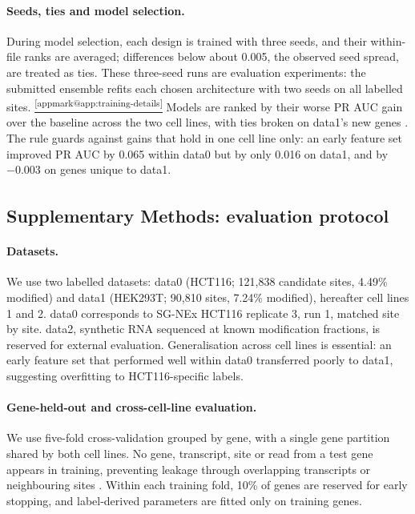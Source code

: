 \documentclass[11pt,a4paper]{article}
\makeatletter
\newcounter{appmarknum}
\DeclareRobustCommand{\appmark}[1]{%
    \refstepcounter{appmarknum}\label{appmark@#1}%
    \textsuperscript{\arabic{appmarknum}}}
\DeclareRobustCommand{\applink}[1]{%
    \hyperref[#1]{\textsuperscript{\ref*{appmark@#1}}}}
\makeatother
\begin{document}
\paragraph{Seeds, ties and model selection.}
During model selection, each design is trained with three seeds, and their
within-file ranks are averaged; differences below about 0.005, the observed
seed spread, are treated as ties. These three-seed runs are evaluation
experiments: the submitted ensemble refits each chosen architecture with two
seeds on all labelled sites.\applink{app:training-details} Models are ranked by their worse PR AUC gain over the baseline across
the two cell lines, with ties broken on data1's new genes
\citep{gulrajani2021,sagawa2020}. The rule guards against gains that hold in
one cell line only: an early feature set improved PR AUC by 0.065 within data0
but by only 0.016 on data1, and by $-0.003$ on genes unique to data1.

\subsection*{Supplementary Methods: evaluation protocol\texorpdfstring{\appmark{app:evaluation-details}}{}}
\label{app:evaluation-details}


\paragraph{Datasets.}
We use two labelled datasets: data0 (HCT116; 121,838 candidate sites, 4.49\% modified) and data1 (HEK293T; 90,810 sites, 7.24\% modified), hereafter cell lines 1 and 2. data0 corresponds to SG-NEx HCT116 replicate 3, run 1, matched site by site. data2, synthetic RNA sequenced at known modification fractions, is reserved for external evaluation. Generalisation across cell lines is essential: an early feature set that performed well within data0 transferred poorly to data1, suggesting overfitting to HCT116-specific labels.

\paragraph{Gene-held-out and cross-cell-line evaluation.}
We use five-fold cross-validation grouped by gene, with a single gene partition shared by both cell lines. No gene, transcript, site or read from a test gene appears in training, preventing leakage through overlapping transcripts or neighbouring sites \citep{bbag434}. Within each training fold, 10\% of genes are reserved for early stopping, and label-derived parameters are fitted only on training genes.
\end{document}
